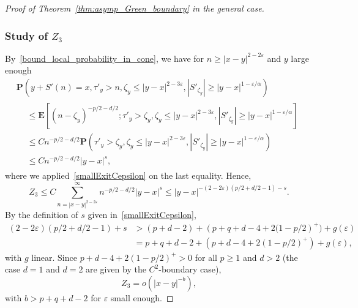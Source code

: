 \documentclass[10pt]{amsart}
\theoremstyle{definition}\newtheorem{defi}[theo]{Definition}\newtheorem{rema}[theo]{Remark}\newtheorem{exam}[theo]{Example}\newtheorem{exem}[theo]{Example}\newtheorem{nota}[theo]{Notation}
\newcommand{\pr}{\mathbf{P}}
\newcommand{\e}{\mathbf{E}}
\renewcommand{\epsilon}{\varepsilon}
\renewcommand{\leq}{\leqslant}
\renewcommand{\geq}{\geqslant}
\begin{document}
\begin{proof}[Proof of Theorem~\ref{thm:asymp_Green_boundary} in the general case]
\subsubsection*{Study of \texorpdfstring{$Z_3$}{Z3}} 
By~\eqref{bound_local_probability_in_cone}, we have for $n\geq | x-y|^{2-2\epsilon}$ and $y$ large enough
\begin{multline*}
\pr\left(y+S'(n)=x,\tau'_{y}>n,\zeta_{y}\leq | y-x|^{2-3\epsilon},\left|S'_{\zeta_{y}}\right| \geq | y-x|^{1-\epsilon/\alpha}\right)\\
\begin{aligned}
&\leq \e\left[(n-\zeta_{y})^{-p/2-d/2};\tau'_{y}>\zeta_{y},\zeta_{y}\leq |y-x|^{2-3\epsilon},\left|S'_{\zeta_{y}}\right| \geq | y-x|^{1-\epsilon/\alpha}\right]\\
&\leq Cn^{-p/2-d/2}\pr\left(\tau'_{y}>\zeta_{y},\zeta_{y}\leq |y-x|^{2-3\epsilon},\left| S'_{\zeta_{y}}\right| \geq | y-x|^{1-\epsilon/\alpha}\right)\\
&\leq Cn^{-p/2-d/2}|y-x|^{s},
\end{aligned}
\end{multline*}
where we applied~\eqref{smallExitCepsilon} on the last equality. Hence,
\[
Z_{3}\leq C\sum_{n=|x-y|^{2-2\epsilon}}^{\infty} n^{-p/2-d/2}|y-x|^{s}\leq |y-x|^{-(2-2\epsilon)(p/2+d/2-1)-s}.
\]
By the definition of $s$ given in~\eqref{smallExitCepsilon},
\begin{align*}
(2-2\epsilon)(p/2+d/2-1)+s&> (p+d-2)+\left(p+q+d-4+2(1-p/2\right)^{+})+g(\epsilon)\\
&=p+q+d-2+\left(p+d-4+2(1-p/2)^{+}\right)+g(\epsilon),
\end{align*}
with $g$ linear. Since $p+d-4+2(1-p/2)^{+}> 0$ for all $p\geq 1$ and $d> 2$ (the case $d=1$ and $d=2$ are given by the $C^2$-boundary case),
\[
Z_{3}=o\left(| x-y|^{-b}\right),
\]
with $b>p+q+d-2$ for $\epsilon$ small enough.




\end{proof}
\end{document}
